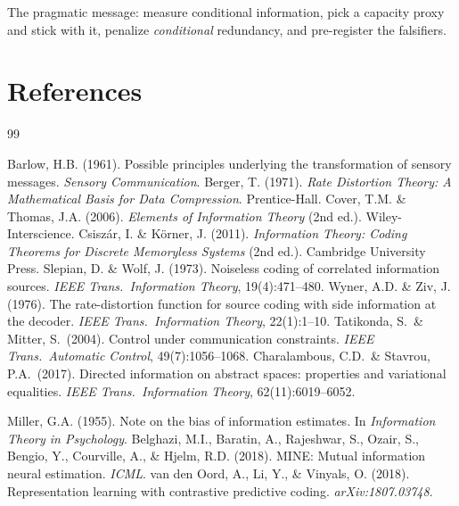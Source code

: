 \documentclass[10pt, letterpaper]{article}
\begin{document}
The pragmatic message: measure conditional information, pick a capacity proxy and stick with it, penalize \emph{conditional} redundancy, and pre-register the falsifiers.

\section*{References}

\begin{thebibliography}{99}

 Barlow, H.B. (1961). Possible principles underlying the transformation of sensory messages. \emph{Sensory Communication}.
 Berger, T. (1971). \emph{Rate Distortion Theory: A Mathematical Basis for Data Compression}. Prentice-Hall.
 Cover, T.M. \& Thomas, J.A. (2006). \emph{Elements of Information Theory} (2nd ed.). Wiley-Interscience.
 Csisz\'ar, I. \& K\"orner, J. (2011). \emph{Information Theory: Coding Theorems for Discrete Memoryless Systems} (2nd ed.). Cambridge University Press.
 Slepian, D. \& Wolf, J. (1973). Noiseless coding of correlated information sources. \emph{IEEE Trans.\ Information Theory}, 19(4):471--480.
 Wyner, A.D. \& Ziv, J. (1976). The rate-distortion function for source coding with side information at the decoder. \emph{IEEE Trans.\ Information Theory}, 22(1):1--10.
 Tatikonda, S.\ \& Mitter, S.\ (2004). Control under communication constraints. \emph{IEEE Trans.\ Automatic Control}, 49(7):1056--1068.
 Charalambous, C.D.\ \& Stavrou, P.A.\ (2017). Directed information on abstract spaces: properties and variational equalities. \emph{IEEE Trans.\ Information Theory}, 62(11):6019--6052.

 Miller, G.A. (1955). Note on the bias of information estimates. In \emph{Information Theory in Psychology}.
 Belghazi, M.I., Baratin, A., Rajeshwar, S., Ozair, S., Bengio, Y., Courville, A., \& Hjelm, R.D. (2018). MINE: Mutual information neural estimation. \emph{ICML}.
 van den Oord, A., Li, Y., \& Vinyals, O. (2018). Representation learning with contrastive predictive coding. \emph{arXiv:1807.03748}.


\end{thebibliography}
\end{document}
